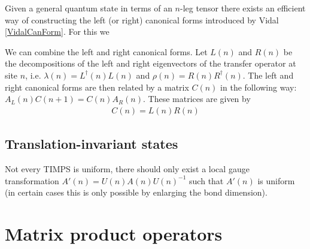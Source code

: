 	\begin{method}[Vidal]
		Given a general quantum state in terms of an $n$-leg tensor there exists an efficient way of constructing the left (or right) canonical forms introduced by Vidal \ref{VidalCanForm}. For this we 
	\end{method}
	
	\begin{construct}
		We can combine the left and right canonical forms. Let $L(n)$ and $R(n)$ be the decompositions of the left and right eigenvectors of the transfer operator at site $n$, i.e. $\lambda(n)=L^\dag(n)L(n)$ and $\rho(n)=R(n)R^\dag(n)$. The left and right canonical forms are then related by a matrix $C(n)$ in the following way: $A_L(n)C(n+1)=C(n)A_R(n)$. These matrices are given by
		\begin{gather}
			C(n)=L(n)R(n)
		\end{gather}
	\end{construct}
	
\subsection{Translation-invariant states}

	\begin{remark}[TIMPS]
		Not every TIMPS is uniform, there should only exist a local gauge transformation $A'(n) = U(n)A(n)U(n)^{-1}$ such that $A'(n)$ is uniform (in certain cases this is only possible by enlarging the bond dimension).
	\end{remark}


\section{Matrix product operators}

	
